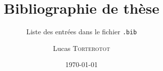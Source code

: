 \documentclass[11pt,a4paper,twoside]{article}
\title{Bibliographie de thèse}
\author[L. \textsc{Torterotot}]{Lucas \textsc{Torterotot}}
\date{\today}
\subtitle{Liste des entrées dans le fichier \texttt{.bib}}
\begin{document}
\maketitle
\nocite{*}
\printbibliography
\end{document}
